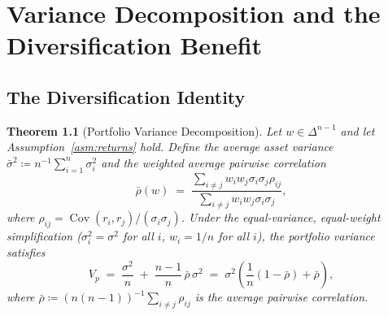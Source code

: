 \documentclass[12pt,openany]{book}
\newcommand{\bfw}{\mathbf{w}}
\DeclareMathOperator{\Cov}{Cov}
\numberwithin{equation}{chapter}
\theoremstyle{plain}
\newtheorem{theorem}{Theorem}[chapter]
\theoremstyle{definition}
\theoremstyle{remark}
\def\bfw{w}%
\begin{document}
\chapter{Variance Decomposition and the Diversification Benefit}
\label{ch:variance}

\section{The Diversification Identity}

\begin{theorem}[Portfolio Variance Decomposition]
\label{thm:diversification-bound}
Let $\bfw \in \Delta^{n-1}$ and let Assumption~\ref{asm:returns} hold.
Define the \emph{average asset variance}
$\bar{\sigma}^2 \coloneqq n^{-1}\sum_{i=1}^n \sigma_i^2$
and the \emph{weighted average pairwise correlation}
\begin{equation}
  \bar{\rho}(\bfw)
  \;=\;
  \frac{
    \displaystyle\sum_{i \neq j} w_i w_j \sigma_i \sigma_j \rho_{ij}
  }{
    \displaystyle\sum_{i \neq j} w_i w_j \sigma_i \sigma_j
  },
  \label{eq:avg-corr}
\end{equation}
where $\rho_{ij} = \Cov(r_i, r_j) / (\sigma_i \sigma_j)$.
Under the equal-variance, equal-weight simplification
($\sigma_i^2 = \sigma^2$ for all $i$, $w_i = 1/n$ for all $i$),
the portfolio variance satisfies
\begin{equation}
  V_p
  \;=\;
  \frac{\sigma^2}{n}
  \;+\;
  \frac{n-1}{n}\,\bar{\rho}\,\sigma^2
  \;=\;
  \sigma^2\!\left(
    \frac{1}{n}(1 - \bar{\rho}) + \bar{\rho}
  \right),
  \label{eq:div-identity}
\end{equation}
where $\bar{\rho} \coloneqq (n(n-1))^{-1}\sum_{i \neq j}\rho_{ij}$
is the average pairwise correlation.
\end{theorem}
\end{document}
